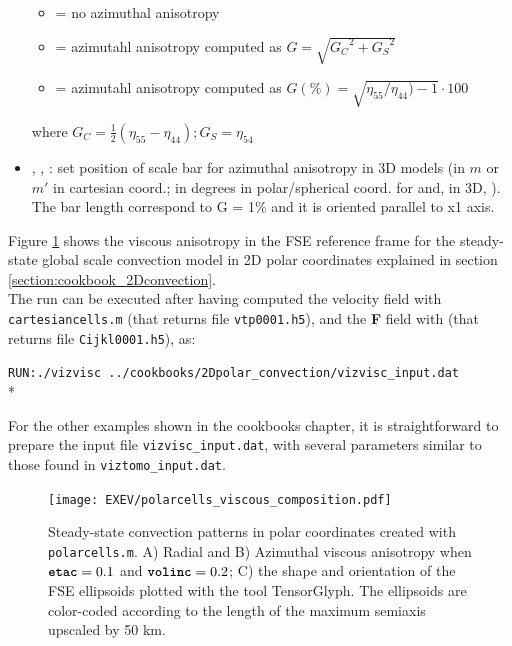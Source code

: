 \begin{itemize}
    \begin{itemize}
        \item[]  = no azimuthal anisotropy
        \item[]  = azimutahl anisotropy computed as $G=\sqrt{{G_C}^2+{G_S}^2} $ 
        \item[]  = azimutahl anisotropy computed as $G(\%)=\sqrt{\eta_{55}/\eta_{44} )-1}\cdot100$
    \end{itemize}
    where $G_C=\frac{1}{2}(\eta_{55}-\eta_{44} )  ; G_S=\eta_{54}$
	
	\item {}, , : set position of scale bar for azimuthal anisotropy in 3D models (in $m$ or $m'$ in cartesian coord.; in degrees in polar/spherical coord. for  and, in 3D, ). The bar length correspond to G = 1\% and it is oriented parallel to x1 axis. 
	
\end{itemize}

\vspace{1cm}

Figure \ref{fig:polarcells_viscous} shows the viscous anisotropy in the FSE reference frame for the steady-state global scale convection model in 2D polar coordinates explained in section \ref{section:cookbook_2Dconvection}. \\
The run can be executed after having computed the velocity field with \texttt{cartesiancells.m} (that returns file \texttt{vtp0001.h5}), and the \textbf{F} field with \drexmtitle{} (that returns file \texttt{Cijkl0001.h5}), as:

\texttt{RUN:./vizvisc ../cookbooks/2Dpolar\_convection/vizvisc\_input.dat}\\*

For the other examples shown in the cookbooks chapter, it is straightforward to prepare the input file \texttt{vizvisc\_input.dat}, with several parameters similar to those found in \texttt{viztomo\_input.dat}.

\begin{figure}[ht]
    \centering
    \texttt{[image: EXEV/polarcells\_viscous\_composition.pdf]}
    \caption{Steady-state  convection  patterns  in  polar  coordinates  created  with \texttt{polarcells.m}.  A) Radial and B) Azimuthal viscous anisotropy when $\textbf{\texttt{etac}}=0.1$ and $\textbf{\texttt{volinc}}=0.2$; C) the shape and orientation of the FSE ellipsoids plotted with the \paraviewtitle{} tool TensorGlyph. The ellipsoids are color-coded according to the length of the maximum semiaxis upscaled by 50 km.\\
    }
    \label{fig:polarcells_viscous}
\end{figure}

\vfill %

\vfill{}

\newpage

